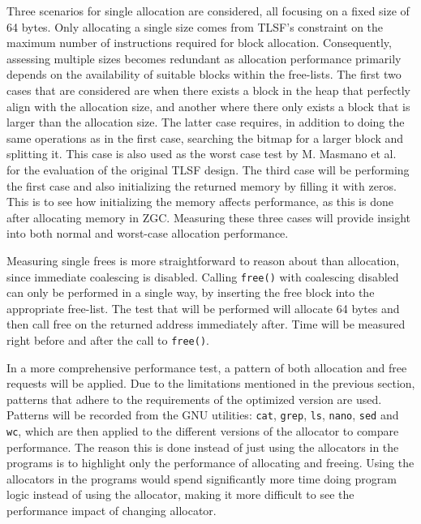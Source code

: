 Three scenarios for single allocation are considered, all focusing on a fixed size of 64 bytes. Only allocating a single size comes from TLSF's constraint on the maximum number of instructions required for block allocation. Consequently, assessing multiple sizes becomes redundant as allocation performance primarily depends on the availability of suitable blocks within the free-lists. The first two cases that are considered are when there exists a block in the heap that perfectly align with the allocation size, and another where there only exists a block that is larger than the allocation size. The latter case requires, in addition to doing the same operations as in the first case, searching the bitmap for a larger block and splitting it. This case is also used as the worst case test by M. Masmano et al.~\cite{TLSF} for the evaluation of the original TLSF design. The third case will be performing the first case and also initializing the returned memory by filling it with zeros. This is to see how initializing the memory affects performance, as this is done after allocating memory in ZGC. Measuring these three cases will provide insight into both normal and worst-case allocation performance.

Measuring single frees is more straightforward to reason about than allocation, since immediate coalescing is disabled. Calling \texttt{free()} with coalescing disabled can only be performed in a single way, by inserting the free block into the appropriate free-list. The test that will be performed will allocate 64 bytes and then call free on the returned address immediately after. Time will be measured right before and after the call to \texttt{free()}.

In a more comprehensive performance test, a pattern of both allocation and free requests will be applied. Due to the limitations mentioned in the previous section, patterns that adhere to the requirements of the optimized version are used. Patterns will be recorded from the GNU utilities: \texttt{cat}, \texttt{grep}, \texttt{ls}, \texttt{nano}, \texttt{sed} and \texttt{wc}, which are then applied to the different versions of the allocator to compare performance. The reason this is done instead of just using the allocators in the programs is to highlight only the performance of allocating and freeing. Using the allocators in the programs would spend significantly more time doing program logic instead of using the allocator, making it more difficult to see the performance impact of changing allocator.

